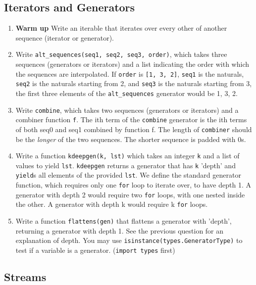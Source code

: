 \documentclass[a4paper]{book}
\begin{document}
\subsection{Iterators and Generators}

\begin{enumerate}
\item \textbf{Warm up} Write an iterable that iterates over every other of another sequence (iterator or generator).
\item Write {\tt alt\_sequences(seq1, seq2, seq3, order)}, which takes three sequences (generators or iterators) and a list indicating the order with which the sequences are interpolated. If {\tt order} is {\tt [1, 3, 2]}, {\tt seq1} is the naturals, {\tt seq2} is the naturals starting from 2, and {\tt seq3} is the naturals starting from 3, the first three elements of the {\tt alt\_sequences} generator would be 1, 3, 2.
\item Write {\tt combine}, which takes two sequences (generators or iterators) and a combiner function {\tt f}. The ith term of the {\tt combine} generator is the ith terms of both seq0 and seq1 combined by function f. The length of {\tt combiner} should be the \textit{longer} of the two sequences. The shorter sequence is padded with 0s.
\item Write a function {\tt kdeepgen(k, lst)} which takes an integer {\tt k} and a list of values to yield {\tt lst}. {\tt kdeepgen} returns a generator that has {\tt k} 'depth' and {\tt yield}s all elements of the provided {\tt lst}. We define the standard generator function, which requires only one {\tt for} loop to iterate over, to have depth 1. A generator with depth 2 would require two {\tt for} loops, with one nested inside the other. A generator with depth k would require k {\tt for} loops.
\item Write a function {\tt flattens(gen)} that flattens a generator with 'depth', returning a generator with depth 1. See the previous question for an explanation of depth. You may use {\tt isinstance(types.GeneratorType)} to test if a variable is a generator. ({\tt import types} first)
\end{enumerate}

\subsection{Streams}
\end{document}
